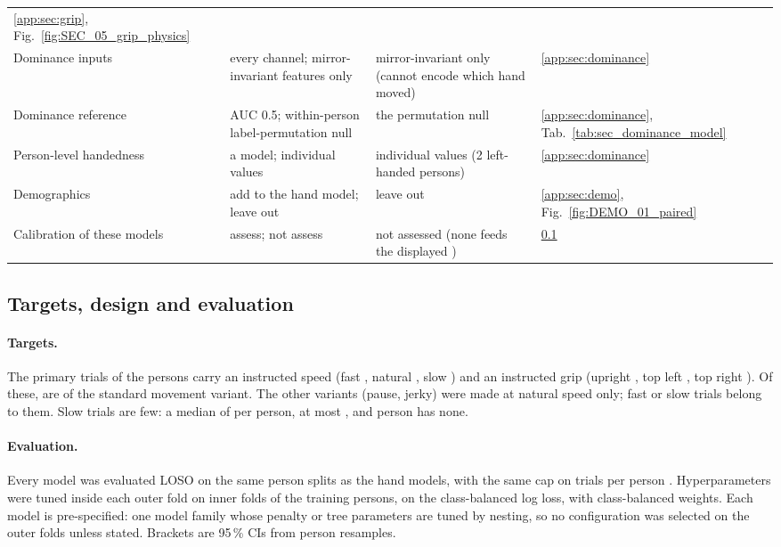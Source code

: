 \begin{table}[tbp]
\begin{tabularx}{\linewidth}{@{}>{\raggedright\arraybackslash}p{2.5cm}>{\raggedright\arraybackslash}X%
>{\raggedright\arraybackslash}X>{\raggedright\arraybackslash}p{2.3cm}@{}}
  \ref{app:sec:grip}, Fig.~\ref{fig:SEC_05_grip_physics} \\
Dominance inputs & every channel; mirror-invariant features only & mirror-invariant only (cannot encode
  which hand moved) & \ref{app:sec:dominance} \\
Dominance reference & AUC 0.5; within-person label-permutation null & the permutation null &
  \ref{app:sec:dominance}, Tab.~\ref{tab:sec_dominance_model} \\
Person-level handedness & a model; individual values & individual values (2 left-handed persons) &
  \ref{app:sec:dominance} \\
Demographics & add to the hand model; leave out & leave out & \ref{app:sec:demo},
  Fig.~\ref{fig:DEMO_01_paired} \\
Calibration of these models & assess; not assess & not assessed (none feeds the displayed \pright{}) &
  \ref{app:sec:design} \\
\bottomrule
\end{tabularx}
\end{table}

\subsection{Targets, design and evaluation}\label{app:sec:design}

\paragraph{Targets.} The  primary trials of the  persons carry an instructed
speed (fast , natural , slow ) and an instructed
grip (upright , top left , top right ).
Of these,  are of the standard movement variant. The other variants (pause, jerky) were made at
natural speed only;  fast or slow trials belong to them. Slow trials are few: a
median of  per person, at most , and
 person has none.

\paragraph{Evaluation.} Every model was evaluated LOSO on the same person splits as the hand models, with the
same cap on trials per person \cite{saeb2017usecase}. Hyperparameters were tuned inside each outer fold on inner
folds of the training persons, on the class-balanced log loss, with class-balanced weights. Each model is
pre-specified: one model family whose penalty or tree parameters are tuned by nesting, so no configuration was
selected on the outer folds unless stated. Brackets are 95\,\% CIs from  person resamples.

